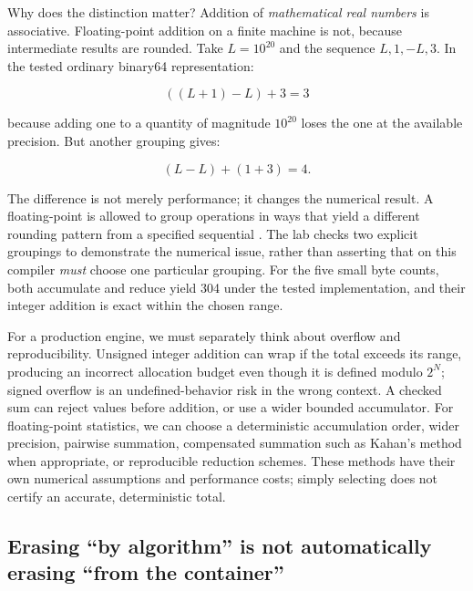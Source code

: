 Why does the distinction matter? Addition of \emph{mathematical real numbers} is associative. Floating-point addition on a finite machine is not, because intermediate results are rounded. Take \(L=10^{20}\) and the sequence \(L,1,-L,3\). In the tested ordinary binary64 representation:

\[
((L+1)-L)+3 = 3
\]

because adding one to a quantity of magnitude \(10^{20}\) loses the one at the available precision. But another grouping gives:

\[
(L-L)+(1+3)=4.
\]

The difference is not merely performance; it changes the numerical result. A floating-point  is allowed to group operations in ways that yield a different rounding pattern from a specified sequential . The lab checks two explicit groupings to demonstrate the numerical issue, rather than asserting that  on this compiler \emph{must} choose one particular grouping. For the five small  byte counts, both accumulate and reduce yield 304 under the tested implementation, and their integer addition is exact within the chosen range.

For a production engine, we must separately think about overflow and reproducibility. Unsigned integer addition can wrap if the total exceeds its range, producing an incorrect allocation budget even though it is defined modulo \(2^N\); signed overflow is an undefined-behavior risk in the wrong context. A checked sum can reject values before addition, or use a wider bounded accumulator. For floating-point statistics, we can choose a deterministic accumulation order, wider precision, pairwise summation, compensated summation such as Kahan's method when appropriate, or reproducible reduction schemes. These methods have their own numerical assumptions and performance costs; simply selecting  does not certify an accurate, deterministic total.

\subsection{Erasing ``by algorithm'' is not automatically erasing ``from the container''}\label{05-engine-i-ch006-erasing-by-algorithm-is-not-automatically-erasing-from-the-container}

\hypertarget{05-engine-i-ch006-erasing-by-algorithm-is-not-automatically-erasing-from-the-container}{}

